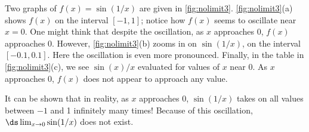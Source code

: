 %
{Two graphs of $f(x) = \sin(1/x)$ are given in \autoref{fig:nolimit3}. \autoref{fig:nolimit3}(a) shows $f(x)$ on the interval $[-1,1]$; notice how $f(x)$ seems to oscillate near $x=0$. One might think that despite the oscillation, as $x$ approaches 0, $f(x)$ approaches 0. However, \autoref{fig:nolimit3}(b) zooms in on $\sin(1/x)$, on the interval $[-0.1,0.1]$. Here the oscillation is even more pronounced. Finally, in the table in \autoref{fig:nolimit3}(c), we see $\sin(x)/x$ evaluated for values of $x$ near 0. As $x$ approaches 0, $f(x)$ does not appear to approach any value. 

It can be shown that in reality, as $x$ approaches 0, $\sin(1/x)$ takes on all values between $-1$ and 1 infinitely many times! Because of this oscillation,
$\ds\lim_{x\to 0}\sin(1/x)$ does not exist.}

